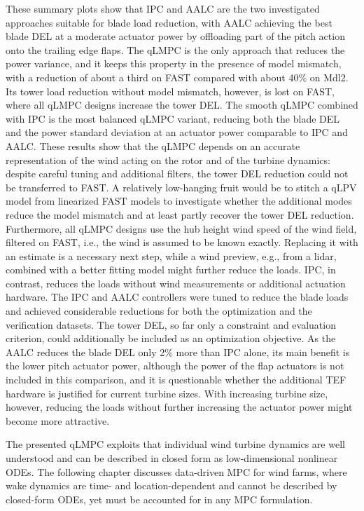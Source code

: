 These summary plots show that IPC and AALC are the two investigated approaches suitable for blade load reduction, with AALC achieving the best blade DEL at a moderate actuator power by offloading part of the pitch action onto the trailing edge flaps. The qLMPC is the only approach that reduces the power variance, and it keeps this property in the presence of model mismatch, with a reduction of about a third on FAST compared with about 40\% on Mdl2. Its tower load reduction without model mismatch, however, is lost on FAST, where all qLMPC designs increase the tower DEL. The smooth qLMPC combined with IPC is the most balanced qLMPC variant, reducing both the blade DEL and the power standard deviation at an actuator power comparable to IPC and AALC.
%
These results show that the qLMPC depends on an accurate representation of the wind acting on the rotor and of the turbine dynamics: despite careful tuning and additional filters, the tower DEL reduction could not be transferred to FAST. A relatively low-hanging fruit would be to stitch a qLPV model from linearized FAST models to investigate whether the additional modes reduce the model mismatch and at least partly recover the tower DEL reduction. Furthermore, all qLMPC designs use the hub height wind speed of the wind field, filtered on FAST, i.e., the wind is assumed to be known exactly. Replacing it with an estimate is a necessary next step, while a wind preview, e.g., from a lidar, combined with a better fitting model might further reduce the loads.
%
IPC, in contrast, reduces the loads without wind measurements or additional actuation hardware. The IPC and AALC controllers were tuned to reduce the blade loads and achieved considerable reductions for both the optimization and the verification datasets. The tower DEL, so far only a constraint and evaluation criterion, could additionally be included as an optimization objective. As the AALC reduces the blade DEL only 2\% more than IPC alone, its main benefit is the lower pitch actuator power, although the power of the flap actuators is not included in this comparison, and it is questionable whether the additional TEF hardware is justified for current turbine sizes. With increasing turbine size, however, reducing the loads without further increasing the actuator power might become more attractive.

The presented qLMPC exploits that individual wind turbine dynamics are well understood and can be described in closed form as low-dimensional nonlinear ODEs. The following chapter discusses data-driven MPC for wind farms, where wake dynamics are time- and location-dependent and cannot be described by closed-form ODEs, yet must be accounted for in any MPC formulation.